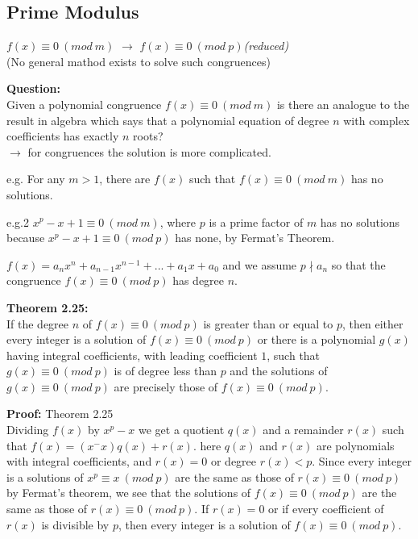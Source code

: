 \documentclass[a4paper]{article}
\begin{document}

\subsection{Prime Modulus}

$f(x)\equiv 0\ (mod\ m)$ $\to$ $f(x)\equiv 0\ (mod\ p)$\quad \textit{(reduced)}\\
(No general mathod exists to solve such congruences)

\textbf{Question:}\\
Given a polynomial congruence $f(x)\equiv 0\ (mod\ m)$ is there an analogue to
the result in algebra which says that a polynomial equation of degree $n$ with
complex coefficients has exactly $n$ roots?\\
$\to$ for congruences the solution is more complicated.

e.g. For any $m>1$, there are $f(x)$ such that $f(x)\equiv 0\ (mod\ m)$
has no solutions.

e.g.2 $x^p-x+1\equiv 0\ (mod\ m)$, where $p$ is a prime factor of $m$ has no
solutions because $x^p-x+1\equiv 0\ (mod\ p)$ has none, by Fermat's Theorem.

$f(x)=a_nx^n+a_{n-1}x^{n-1}+...+a_1x+a_0$ and we assume $p\nmid a_n$
so that the congruence $f(x)\equiv 0\ (mod\ p)$ has degree $n$.

\textbf{Theorem 2.25:}\\
If the degree $n$ of $f(x)\equiv 0\ (mod\ p)$ is greater than or equal to $p$,
then either every integer is a solution of $f(x)\equiv 0\ (mod\ p)$ or there is
a polynomial $g(x)$ having integral coefficients, with leading coefficient $1$,
such that $g(x)\equiv 0\ (mod\ p)$ is of degree less than $p$ and the solutions
of $g(x)\equiv 0\ (mod\ p)$ are precisely those of $f(x)\equiv 0\ (mod\ p)$.

\textbf{Proof:} Theorem 2.25\\
Dividing $f(x)$ by $x^p-x$ we get a quotient $q(x)$ and a remainder $r(x)$
such that $f(x)=(x^-x)q(x)+r(x)$. here $q(x)$ and $r(x)$ are polynomials
with integral coefficients, and $r(x)=0$ or degree $r(x)<p$. Since every
integer is a solutions of $x^p\equiv x\ (mod\ p)$ are the same as those of
$r(x)\equiv 0\ (mod\ p)$ by Fermat's theorem, we see that the solutions of
$f(x)\equiv 0\ (mod\ p)$ are the same as those of $r(x)\equiv 0\ (mod\ p)$.
If $r(x)=0$ or if every coefficient of $r(x)$ is divisible by $p$, then every
integer is a solution of $f(x)\equiv 0\ (mod\ p)$.
\end{document}
